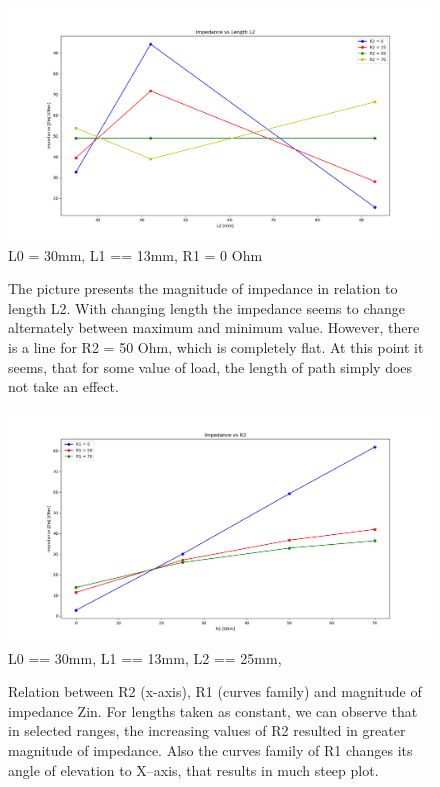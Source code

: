 \documentclass[eng,printmode]{mgr}
\begin{document}
\begin{figure}[!h]
	\centering
	\includegraphics[width=1\linewidth]{Figure_3}
	L0 = 30mm, L1 == 13mm, R1 = 0 Ohm
	\caption{The picture presents the magnitude of impedance in relation to length L2. With changing length the impedance seems to change alternately between maximum and minimum value. However, there is a line for R2 = 50 Ohm, which is completely flat. At this point it seems, that for some value of load, the length of path simply does not take an effect.}
		\includegraphics[width=1\linewidth]{Figure_1}
	L0 == 30mm, L1 == 13mm, L2 == 25mm,
	\caption{Relation between R2 (x-axis), R1 (curves family) and magnitude of impedance Zin. For lengths taken as constant, we can observe that in selected ranges, the increasing values of R2 resulted in greater magnitude of impedance. Also the curves family of R1 changes its angle of elevation to X--axis, that results in much steep plot.}
\end{figure}
\end{document}
